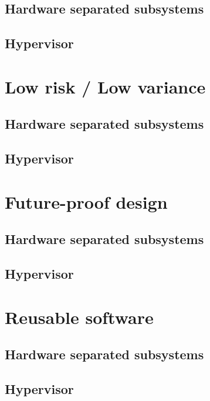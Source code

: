 \subsection{Hardware separated subsystems}
\subsection{Hypervisor}


\section{Low risk / Low variance}
\subsection{Hardware separated subsystems}
\subsection{Hypervisor}


\section{Future-proof design}
\subsection{Hardware separated subsystems}
\subsection{Hypervisor}


\section{Reusable software}
\subsection{Hardware separated subsystems}
\subsection{Hypervisor}

